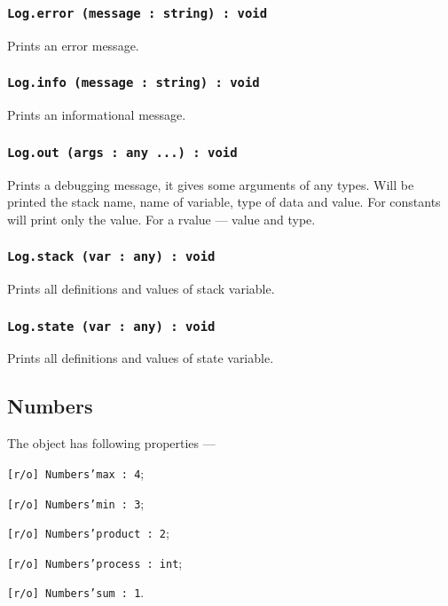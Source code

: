 \subsubsection{\texttt{Log.error (message : string) : void}}

Prints an error message.

\subsubsection{\texttt{Log.info (message : string) : void}}

Prints an informational message.

\subsubsection{\texttt{Log.out (args : any ...) : void}}

Prints a debugging message, it gives some arguments of any types. Will be printed the stack name, name of variable, type of data and value. For constants will print only the value. For a rvalue — value and type.

\subsubsection{\texttt{Log.stack (var : any) : void}}

Prints all definitions and values of stack variable.

\subsubsection{\texttt{Log.state (var : any) : void}}

Prints all definitions and values of state variable.

\subsection{Numbers}

The object \numbers{} has following properties —
\begin{icItems}
	\item \texttt{[r/o] Numbers'max : 4};
	\item \texttt{[r/o] Numbers'min : 3};
	\item \texttt{[r/o] Numbers'product : 2};
	\item \texttt{[r/o] Numbers'process : int};
	\item \texttt{[r/o] Numbers'sum : 1}.
\end{icItems}

